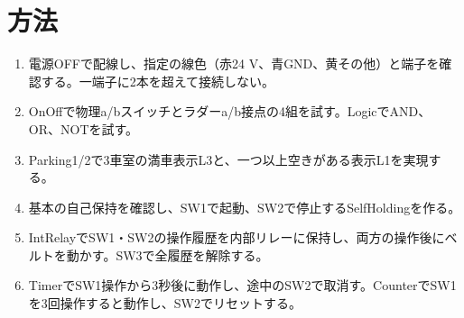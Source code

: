 \documentclass[lualatex,a4paper,10pt]{jlreq}
\begin{document}
\section{方法}\label{sec:auto4}
\begin{enumerate}
\item 電源OFFで配線し、指定の線色（赤24 V、青GND、黄その他）と端子を確認する。一端子に2本を超えて接続しない。
\item OnOffで物理a/bスイッチとラダーa/b接点の4組を試す。LogicでAND、OR、NOTを試す。
\item Parking1/2で3車室の満車表示L3と、一つ以上空きがある表示L1を実現する。
\item 基本の自己保持を確認し、SW1で起動、SW2で停止するSelfHoldingを作る。
\item IntRelayでSW1・SW2の操作履歴を内部リレーに保持し、両方の操作後にベルトを動かす。SW3で全履歴を解除する。
\item TimerでSW1操作から3秒後に動作し、途中のSW2で取消す。CounterでSW1を3回操作すると動作し、SW2でリセットする。
\end{enumerate}
\clearpage
\end{document}
